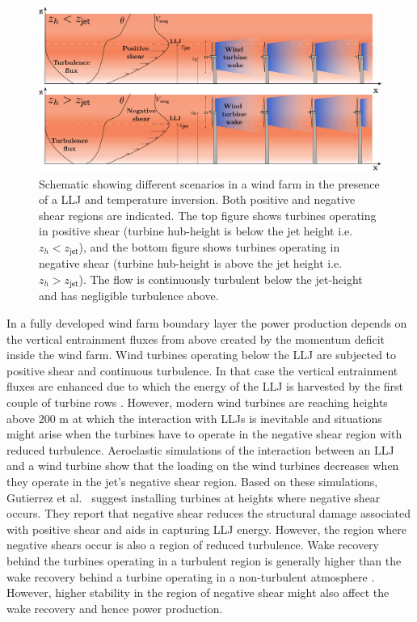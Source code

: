 \documentclass[%
 aip,
 amsmath,amssymb,
preprint,%
author-numerical,%
]{revtex4-1}
\begin{document}
\begin{figure}
 \centering
 \includegraphics[width=1.0\linewidth]{llj_2.png}
 \vspace{-0.5cm}
 \caption{Schematic showing different scenarios in a wind farm in the presence of a LLJ and temperature inversion. Both positive and negative shear regions are indicated. The top figure shows turbines operating in positive shear (turbine hub-height is below the jet height i.e.\ $z_h < z_\mathsf{jet}$), and the bottom figure shows turbines operating in negative shear (turbine hub-height is above the jet height i.e.\ $z_h > z_\mathsf{jet}$). The flow is continuously turbulent below the jet-height and has negligible turbulence above.}
 \label{fig1}
\end{figure}

In a fully developed wind farm boundary layer the power production depends on the vertical entrainment fluxes from above created by the momentum deficit inside the wind farm. Wind turbines operating below the LLJ are subjected to positive shear and continuous turbulence. In that case the vertical entrainment fluxes are enhanced due to which the energy of the LLJ is harvested by the first couple of turbine rows \cite{na18, nag20b}. However, modern wind turbines are reaching heights above $200$ m at which the interaction with LLJs is inevitable and situations might arise when the turbines have to operate in the negative shear region with reduced turbulence. Aeroelastic simulations of the interaction between an LLJ and a wind turbine show that the loading on the wind turbines decreases when they operate in the jet's negative shear region. Based on these simulations, Gutierrez et al.\ \cite{gut17} suggest installing turbines at heights where negative shear occurs. They report that negative shear reduces the structural damage associated with positive shear and aids in capturing LLJ energy. However, the region where negative shears occur is also a region of reduced turbulence. Wake recovery behind the turbines operating in a turbulent region is generally higher than the wake recovery behind a turbine operating in a non-turbulent atmosphere \cite{ste17, por20, ali18b}. However, higher stability in the region of negative shear might also affect the wake recovery and hence power production.
\end{document}
